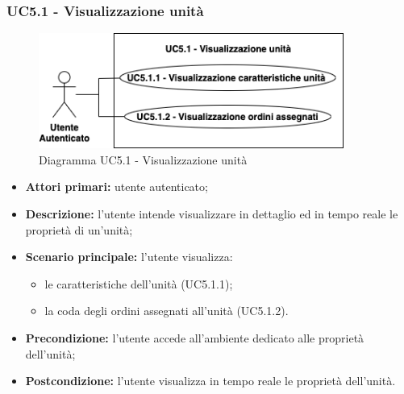     \subsubsection{UC5.1 - Visualizzazione unità}
    \begin{figure}[h!]
        \centering
        \includegraphics[width=10cm]{images/uc5.1.png}
        \caption{Diagramma UC5.1 - Visualizzazione unità}
    \end{figure}
    \begin{itemize}
        \item \textbf{Attori primari:} utente autenticato;
        \item \textbf{Descrizione:} l'utente intende visualizzare in dettaglio ed in tempo reale le proprietà di un'unità;
        \item \textbf{Scenario principale:} l'utente visualizza:
        \begin{itemize}
            \item le caratteristiche dell'unità (UC5.1.1);
            \item la coda degli ordini assegnati all'unità (UC5.1.2).
        \end{itemize}
        \item \textbf{Precondizione:} l'utente accede all'ambiente dedicato alle proprietà dell'unità;
        \item \textbf{Postcondizione:} l'utente visualizza in tempo reale le proprietà dell'unità.
    \end{itemize}

